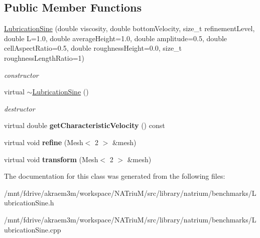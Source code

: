 \subsection*{Public Member Functions}
\begin{DoxyCompactItemize}
\item 
\hypertarget{classnatrium_1_1LubricationSine_aabde5d90ece7568bd26539679554dce3}{
\hyperlink{classnatrium_1_1LubricationSine_aabde5d90ece7568bd26539679554dce3}{LubricationSine} (double viscosity, double bottomVelocity, size\_\-t refinementLevel, double L=1.0, double averageHeight=1.0, double amplitude=0.5, double cellAspectRatio=0.5, double roughnessHeight=0.0, size\_\-t roughnessLengthRatio=1)}
\label{classnatrium_1_1LubricationSine_aabde5d90ece7568bd26539679554dce3}

\begin{DoxyCompactList}\small\item\em constructor \item\end{DoxyCompactList}\item 
\hypertarget{classnatrium_1_1LubricationSine_a5ccd2adc86fca412bbf13027ed5095dd}{
virtual \hyperlink{classnatrium_1_1LubricationSine_a5ccd2adc86fca412bbf13027ed5095dd}{$\sim$LubricationSine} ()}
\label{classnatrium_1_1LubricationSine_a5ccd2adc86fca412bbf13027ed5095dd}

\begin{DoxyCompactList}\small\item\em destructor \item\end{DoxyCompactList}\item 
\hypertarget{classnatrium_1_1LubricationSine_a141a35675ac18a639af4aa7d0690c96d}{
virtual double {\bfseries getCharacteristicVelocity} () const }
\label{classnatrium_1_1LubricationSine_a141a35675ac18a639af4aa7d0690c96d}

\item 
\hypertarget{classnatrium_1_1LubricationSine_a6f22664f888db4f1bf7c3cd72f7c107c}{
virtual void {\bfseries refine} (Mesh$<$ 2 $>$ \&mesh)}
\label{classnatrium_1_1LubricationSine_a6f22664f888db4f1bf7c3cd72f7c107c}

\item 
\hypertarget{classnatrium_1_1LubricationSine_a4c8a4b5d3321dfc31a754bb38d97700f}{
virtual void {\bfseries transform} (Mesh$<$ 2 $>$ \&mesh)}
\label{classnatrium_1_1LubricationSine_a4c8a4b5d3321dfc31a754bb38d97700f}

\end{DoxyCompactItemize}


The documentation for this class was generated from the following files:\begin{DoxyCompactItemize}
\item 
/mnt/fdrive/akraem3m/workspace/NATriuM/src/library/natrium/benchmarks/LubricationSine.h\item 
/mnt/fdrive/akraem3m/workspace/NATriuM/src/library/natrium/benchmarks/LubricationSine.cpp\end{DoxyCompactItemize}
